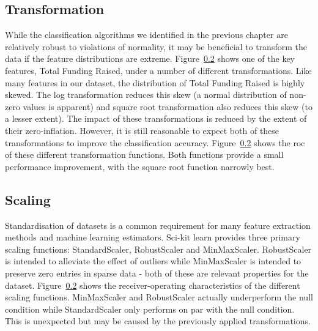 \documentclass[../thesis/thesis.tex]{subfiles}
\begin{document}


\subsection{Transformation}

While the classification algorithms we identified in the previous chapter are relatively robust to violations of normality, it may be beneficial to transform the data if the feature distributions are extreme. Figure~\ref{} shows one of the key features, Total Funding Raised, under a number of different transformations. Like many features in our dataset, the distribution of Total Funding Raised is highly skewed. The log transformation reduces this skew (a normal distribution of non-zero values is apparent) and square root transformation also reduces this skew (to a lesser extent). The impact of these transformations is reduced by the extent of their zero-inflation. However, it is still reasonable to expect both of these transformations to improve the classification accuracy. Figure~\ref{} shows the \gls{roc} of these different transformation functions. Both functions provide a small performance improvement, with the square root function narrowly best.



\subsection{Scaling}

Standardisation of datasets is a common requirement for many feature extraction methods and machine learning estimators. Sci-kit learn provides three primary scaling functions: StandardScaler, RobustScaler and MinMaxScaler. RobustScaler is intended to alleviate the effect of outliers while MinMaxScaler is intended to preserve zero entries in sparse data - both of these are relevant properties for the dataset. Figure~\ref{} shows the receiver-operating characteristics of the different scaling functions. MinMaxScaler and RobustScaler actually underperform the null condition while StandardScaler only performs on par with the null condition. This is unexpected but may be caused by the previously applied transformations.

\end{document}

